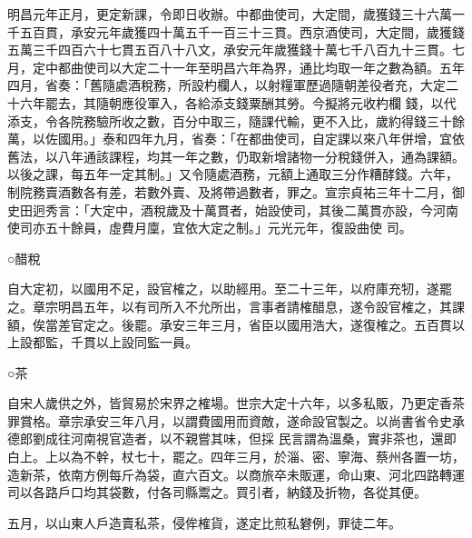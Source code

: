 \begin{pinyinscope}
 明昌元年正月，更定新課，令即日收辦。中都曲使司，大定間，歲獲錢三十六萬一千五百貫，承安元年歲獲四十萬五千一百三十三貫。西京酒使司，大定間，歲獲錢五萬三千四百六十七貫五百八十八文，承安元年歲獲錢十萬七千八百九十三貫。七月，定中都曲使司以大定二十一年至明昌六年為界，通比均取一年之數為額。五年四月，省奏：「舊隨處酒稅務，所設杓欄人，以射糧軍歷過隨朝差役者充，大定二十六年罷去，其隨朝應役軍入，各給添支錢粟酬其勞。今擬將元收杓欄
 錢，以代添支，令各院務驗所收之數，百分中取三，隨課代輸，更不入比，歲約得錢三十餘萬，以佐國用。」泰和四年九月，省奏：「在都曲使司，自定課以來八年併增，宜依舊法，以八年通該課程，均其一年之數，仍取新增諸物一分稅錢併入，通為課額。以後之課，每五年一定其制。」又令隨處酒務，元額上通取三分作糟酵錢。六年，制院務賣酒數各有差，若數外賣、及將帶過數者，罪之。宣宗貞祐三年十二月，御史田迥秀言：「大定中，酒稅歲及十萬貫者，始設使司，其後二萬貫亦設，今河南使司亦五十餘員，虛費月廩，宜依大定之制。」元光元年，復設曲使
 司。



 ○醋稅



 自大定初，以國用不足，設官榷之，以助經用。至二十三年，以府庫充牣，遂罷之。章宗明昌五年，以有司所入不允所出，言事者請榷醋息，遂令設官榷之，其課額，俟當差官定之。後罷。承安三年三月，省臣以國用浩大，遂復榷之。五百貫以上設都監，千貫以上設同監一員。



 ○茶



 自宋人歲供之外，皆貿易於宋界之榷場。世宗大定十六年，以多私販，乃更定香茶罪賞格。章宗承安三年八月，以謂費國用而資敵，遂命設官製之。以尚書省令史承德郎劉成往河南視官造者，以不親嘗其味，但採
 民言謂為溫桑，實非茶也，還即白上。上以為不幹，杖七十，罷之。四年三月，於淄、密、寧海、蔡州各置一坊，造新茶，依南方例每斤為袋，直六百文。以商旅卒未販運，命山東、河北四路轉運司以各路戶口均其袋數，付各司縣鬻之。買引者，納錢及折物，各從其便。



 五月，以山東人戶造賣私茶，侵侔榷貨，遂定比煎私礬例，罪徒二年。




\end{pinyinscope}
